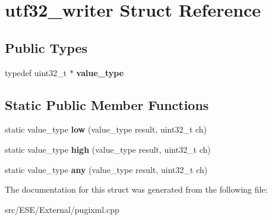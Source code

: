 \hypertarget{structutf32__writer}{\section{utf32\-\_\-writer Struct Reference}
\label{structutf32__writer}
}
\subsection*{Public Types}
\begin{DoxyCompactItemize}
\item 
\hypertarget{structutf32__writer_a2284e1fa3406f113f151ded2aaa8d4ae}{typedef uint32\-\_\-t $\ast$ {\bfseries value\-\_\-type}}\label{structutf32__writer_a2284e1fa3406f113f151ded2aaa8d4ae}

\end{DoxyCompactItemize}
\subsection*{Static Public Member Functions}
\begin{DoxyCompactItemize}
\item 
\hypertarget{structutf32__writer_a06e1b65906f7355ea54a622248095bc7}{static value\-\_\-type {\bfseries low} (value\-\_\-type result, uint32\-\_\-t ch)}\label{structutf32__writer_a06e1b65906f7355ea54a622248095bc7}

\item 
\hypertarget{structutf32__writer_a3f86d996cde3ed7cab5c31930b67c9f1}{static value\-\_\-type {\bfseries high} (value\-\_\-type result, uint32\-\_\-t ch)}\label{structutf32__writer_a3f86d996cde3ed7cab5c31930b67c9f1}

\item 
\hypertarget{structutf32__writer_aa94aaa4a13e755942e7da70ea7700d3e}{static value\-\_\-type {\bfseries any} (value\-\_\-type result, uint32\-\_\-t ch)}\label{structutf32__writer_aa94aaa4a13e755942e7da70ea7700d3e}

\end{DoxyCompactItemize}


The documentation for this struct was generated from the following file\-:\begin{DoxyCompactItemize}
\item 
src/\-E\-S\-E/\-External/pugixml.\-cpp\end{DoxyCompactItemize}
